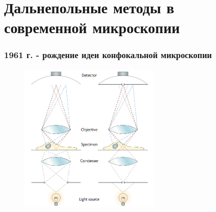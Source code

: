 \documentclass[9pt, compress, xcolor=table]{beamer}
\begin{document}
\section{Дальнепольные методы в современной микроскопии}


\begin{frame}[fragile]
\frametitle{1961 г. - рождение идеи конфокальной микроскопии}
\begin{figure}
\centering
\includegraphics[width=0.6\textwidth]{confocal}
\end{figure}

\end{frame}
\end{document}
